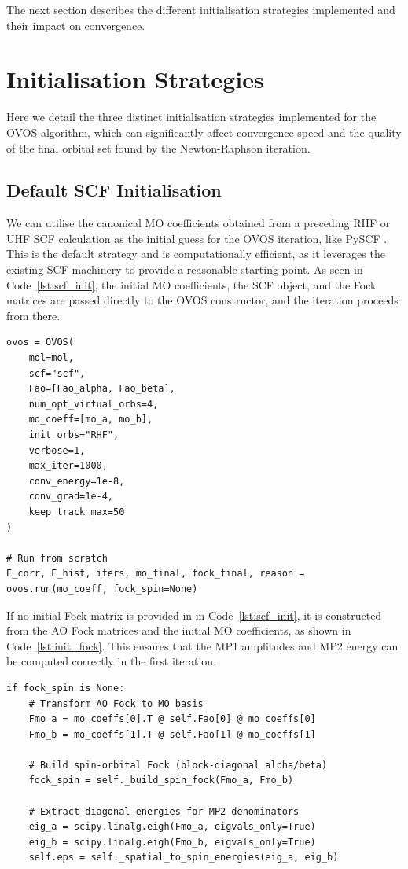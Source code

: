 The next section describes the different initialisation strategies implemented and their impact on convergence.

\section{Initialisation Strategies}
\label{sec:method_initialisation_strategies}

Here we detail the three distinct initialisation strategies implemented for the OVOS algorithm, which can significantly affect convergence speed and the quality of the final orbital set found by the Newton-Raphson iteration.

\subsection{Default SCF Initialisation}

We can utilise the canonical MO coefficients obtained from a preceding RHF or UHF SCF calculation as the initial guess for the OVOS iteration, like PySCF . This is the default strategy and is computationally efficient, as it leverages the existing SCF machinery to provide a reasonable starting point. As seen in Code~\ref{lst:scf_init}, the initial MO coefficients, the SCF object, and the Fock matrices are passed directly to the OVOS constructor, and the iteration proceeds from there. 

\begin{lstlisting}[style=python, caption={OVOS initialization with RHF/UHF starting guess}, label=lst:scf_init]
ovos = OVOS(
    mol=mol,
    scf="scf",          
    Fao=[Fao_alpha, Fao_beta], 
    num_opt_virtual_orbs=4,  
    mo_coeff=[mo_a, mo_b],   
    init_orbs="RHF",         
    verbose=1,
    max_iter=1000,
    conv_energy=1e-8,
    conv_grad=1e-4,
    keep_track_max=50
)

# Run from scratch
E_corr, E_hist, iters, mo_final, fock_final, reason = ovos.run(mo_coeff, fock_spin=None)
\end{lstlisting}

If no initial Fock matrix is provided in  in Code~\ref{lst:scf_init}, it is constructed from the AO Fock matrices and the initial MO coefficients, as shown in Code~\ref{lst:init_fock}. This ensures that the MP1 amplitudes and MP2 energy can be computed correctly in the first iteration.

\begin{lstlisting}[style=python, caption={Initial Fock matrix construction}, label=lst:init_fock]
if fock_spin is None:
    # Transform AO Fock to MO basis
    Fmo_a = mo_coeffs[0].T @ self.Fao[0] @ mo_coeffs[0]
    Fmo_b = mo_coeffs[1].T @ self.Fao[1] @ mo_coeffs[1]
    
    # Build spin-orbital Fock (block-diagonal alpha/beta)
    fock_spin = self._build_spin_fock(Fmo_a, Fmo_b)
    
    # Extract diagonal energies for MP2 denominators
    eig_a = scipy.linalg.eigh(Fmo_a, eigvals_only=True)
    eig_b = scipy.linalg.eigh(Fmo_b, eigvals_only=True)
    self.eps = self._spatial_to_spin_energies(eig_a, eig_b)
\end{lstlisting}

